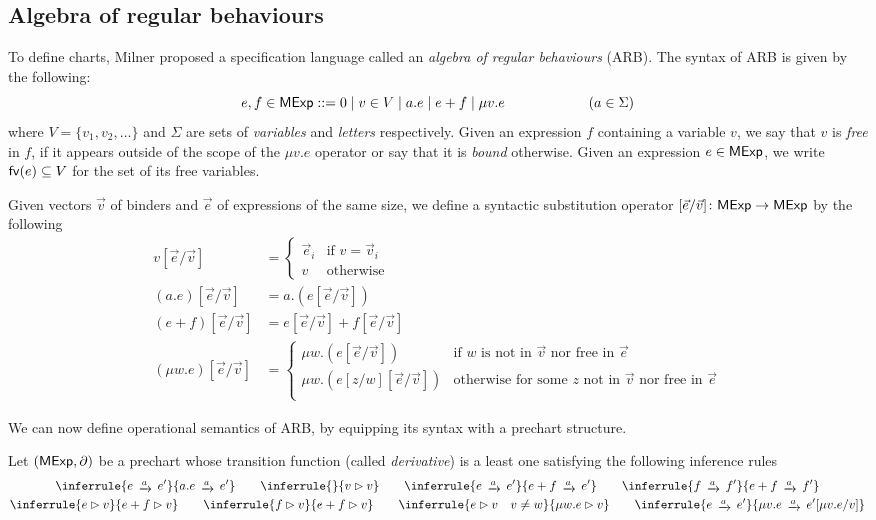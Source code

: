\subsection{Algebra of regular behaviours}
To define charts, Milner proposed a specification language called an \emph{algebra of regular behaviours} (ARB). The syntax of ARB is given by the following:
$$e,f \in \mathsf{MExp} ::= 0 \mid v \in V \mid a.e \mid e + f \mid \mu v. e \qquad\qquad\qquad (a \in \Sigma)$$
where $V=\{v_1, v_2, \dots\}$ and $\Sigma$ are sets of \emph{variables} and \emph{letters} respectively. Given an expression $f$ containing a variable $v$, we say that $v$ is \emph{free} in $f$, if it appears outside of the scope of the $\mu v.e$ operator or say that it is \emph{bound} otherwise. Given an expression $e \in \mathsf{MExp}$, we write $\mathsf{fv}(e) \subseteq V$ for the set of its free variables. 
\begin{definition}\label{def:subset}
	Given vectors $\vec{v}$ of binders and $\vec{e}$ of expressions of the same size, we define a syntactic substitution operator $[\vec{e}/\vec{v}] \colon \mathsf{MExp} \to \mathsf{MExp}$ by the following
	\begin{align*}
		v[\vec{e}/\vec{v}] &= \begin{cases}
			\vec{e}_i & \text{if }v=\vec{v}_i\\
			v & \text{otherwise}
		\end{cases}\\
		(a.e)[\vec{e}/\vec{v}] &= a.(e[\vec{e}/\vec{v}])\\
		(e + f)[\vec{e}/\vec{v}] &= e[\vec{e}/\vec{v}] + f[\vec{e}/\vec{v}]\\
		(\mu w.e)[\vec{e}/\vec{v}] &= \begin{cases}
			\mu w. (e[\vec{e}/\vec{v}]) & \text{if } w \text{ is not in } \vec{v} \text{ nor free in } \vec{e}\\
			\mu w. (e[z/w][\vec{e}/\vec{v}]) & \text{otherwise for some } z \text{ not in } \vec{v} \text{ nor free in } \vec{e}\\
		\end{cases}
	\end{align*}
\end{definition}
We can now define operational semantics of ARB, by equipping its syntax with a prechart structure.
\begin{definition}\label{def:operational_semantics}
	Let $(\mathsf{MExp}, \partial)$ be a prechart whose transition function (called \emph{derivative}) is a least one satisfying the following inference rules
	\begin{gather*}
		\inferrule{e \tr{a} e' }{a.e \tr{a} e'} \qquad \inferrule{ }{v \rhd v} \qquad \inferrule{e \tr{a} e'}{e + f \tr{a} e'} \qquad \inferrule{f \tr{a} f'}{e + f \tr{a} f'}\\
		\inferrule {e \rhd v}{e + f \rhd v} \qquad \inferrule {f \rhd v}{e + f \rhd v} \qquad \inferrule{e \rhd v\quad v \neq w}{\mu w.e \rhd v } \qquad \inferrule{e \tr{a} e'}{\mu v. e \tr{a} e'[\mu v .e / v]}
	\end{gather*}
\end{definition}
